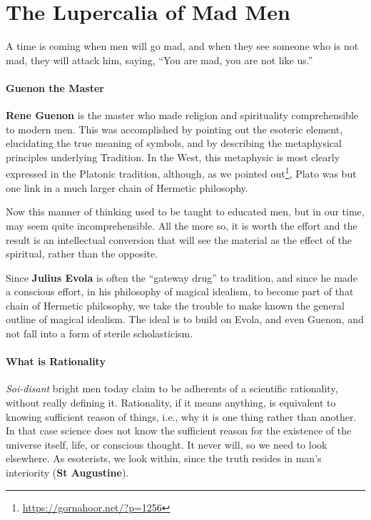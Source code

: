 \section{The Lupercalia of Mad Men}

\begin{quotex}
A time is coming when men will go mad, and when they see someone who is not mad, they will attack him, saying, ``You are mad, you are not like us.''
\end{quotex}


\paragraph{Guenon the Master}


\textbf{Rene Guenon} is the master who made religion and spirituality comprehensible to modern men. This was accomplished by pointing out the esoteric element, elucidating the true meaning of symbols, and by describing the metaphysical principles underlying Tradition. In the West, this metaphysic is most clearly expressed in the Platonic tradition, although, as we pointed out\footnote{\url{https://gornahoor.net/?p=1256}}, Plato was but one link in a much larger chain of Hermetic philosophy.

Now this manner of thinking used to be taught to educated men, but in our time, may seem quite incomprehensible. All the more so, it is worth the effort and the result is an intellectual conversion that will see the material as the effect of the spiritual, rather than the opposite.

Since \textbf{Julius Evola} is often the ``gateway drug'' to tradition, and since he made a conscious effort, in his philosophy of magical idealism, to become part of that chain of Hermetic philosophy, we take the trouble to make known the general outline of magical idealism. The ideal is to build on Evola, and even Guenon, and not fall into a form of sterile scholasticism.

\paragraph{What is Rationality}


\emph{Soi-disant} bright men today claim to be adherents of a scientific rationality, without really defining it. Rationality, if it means anything, is equivalent to knowing sufficient reason of things, i.e., why it is one thing rather than another. In that case science does not know the sufficient reason for the existence of the universe itself, life, or conscious thought. It never will, so we need to look elsewhere. As esoterists, we look within, since the truth resides in man's interiority (\textbf{St Augustine}).

